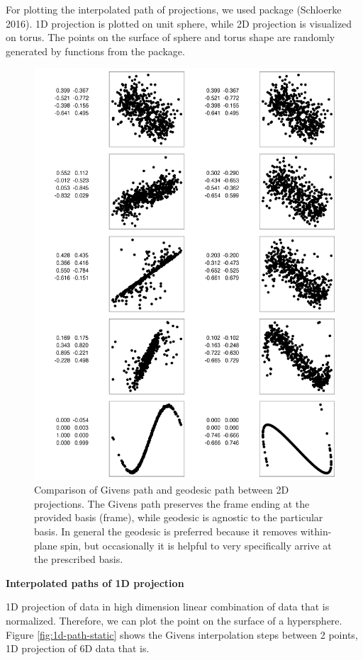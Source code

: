 For plotting the interpolated path of projections, we used  package (Schloerke 2016). 1D projection is plotted on unit sphere, while 2D projection is visualized on torus. The points on the surface of sphere and torus shape are randomly generated by functions from the  package.

\begin{figure}

{\centering \includegraphics[width=0.8\linewidth]{compare-paths} 

}

\caption{Comparison of Givens path and geodesic path between 2D projections. The Givens path preserves the frame ending at the provided basis (frame), while geodesic is agnostic to the particular basis. In general the geodesic is preferred because it removes within-plane spin, but occasionally it is helpful to very specifically arrive at the prescribed basis.}\label{fig:compare-paths}
\end{figure}

\textbf{Interpolated paths of 1D projection}

1D projection of data in high dimension linear combination of data that is normalized. Therefore, we can plot the point on the surface of a hypersphere. Figure \ref{fig:1d-path-static} shows the Givens interpolation steps between 2 points, 1D projection of 6D data that is.

